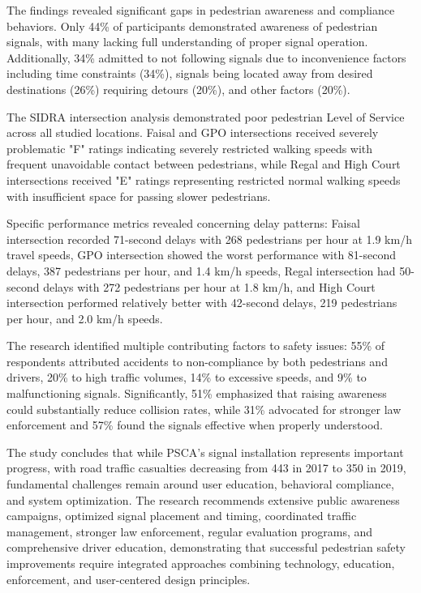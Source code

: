 \documentclass[a4paper, 12pt]{report}
\begin{document}
The findings revealed significant gaps in pedestrian awareness and compliance behaviors. Only 44\% of participants demonstrated awareness of pedestrian signals, with many lacking full understanding of proper signal operation. Additionally, 34\% admitted to not following signals due to inconvenience factors including time constraints (34\%), signals being located away from desired destinations (26\%) requiring detours (20\%), and other factors (20\%).

The SIDRA intersection analysis demonstrated poor pedestrian Level of Service across all studied locations. Faisal and GPO intersections received severely problematic "F" ratings indicating severely restricted walking speeds with frequent unavoidable contact between pedestrians, while Regal and High Court intersections received "E" ratings representing restricted normal walking speeds with insufficient space for passing slower pedestrians.

Specific performance metrics revealed concerning delay patterns: Faisal intersection recorded 71-second delays with 268 pedestrians per hour at 1.9 km/h travel speeds, GPO intersection showed the worst performance with 81-second delays, 387 pedestrians per hour, and 1.4 km/h speeds, Regal intersection had 50-second delays with 272 pedestrians per hour at 1.8 km/h, and High Court intersection performed relatively better with 42-second delays, 219 pedestrians per hour, and 2.0 km/h speeds.

The research identified multiple contributing factors to safety issues: 55\% of respondents attributed accidents to non-compliance by both pedestrians and drivers, 20\% to high traffic volumes, 14\% to excessive speeds, and 9\% to malfunctioning signals. Significantly, 51\% emphasized that raising awareness could substantially reduce collision rates, while 31\% advocated for stronger law enforcement and 57\% found the signals effective when properly understood.

The study concludes that while PSCA's signal installation represents important progress, with road traffic casualties decreasing from 443 in 2017 to 350 in 2019, fundamental challenges remain around user education, behavioral compliance, and system optimization. The research recommends extensive public awareness campaigns, optimized signal placement and timing, coordinated traffic management, stronger law enforcement, regular evaluation programs, and comprehensive driver education, demonstrating that successful pedestrian safety improvements require integrated approaches combining technology, education, enforcement, and user-centered design principles.
\end{document}
